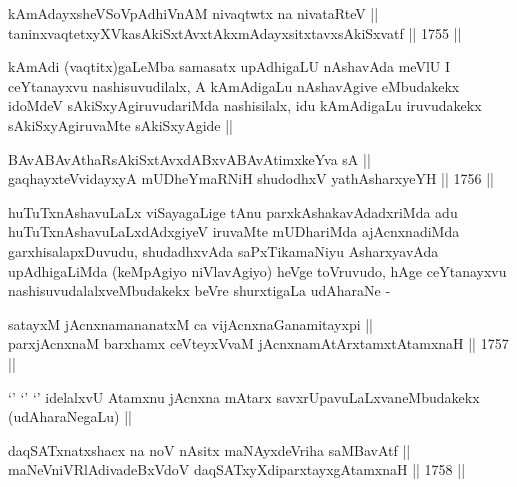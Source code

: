 
\begin{shl}
kAmAdayxsheVSoVpAdhiVnAM nivaqtwtx na nivataRteV || \\
taninxvaqtetxyXVkasAkiSxtAvxtAkxmAdayxsitxtavxsAkiSxvatf ||  1755 ||  
\end{shl}

\begin{artha}
kAmAdi (vaqtitx)gaLeMba samasatx upAdhigaLU nAshavAda meVlU I
ceYtanayxvu nashisuvudilalx, A kAmAdigaLu nAshavAgive eMbudakekx
idoMdeV sAkiSxyAgiruvudariMda nashisilalx, idu kAmAdigaLu iruvudakekx
sAkiSxyAgiruvaMte sAkiSxyAgide ||
\end{artha}


\begin{shl}
BAvABAvAthaRsAkiSxtAvxdABxvABAvAtimxkeYva sA ||  \\
gaqhayxteV\s vidayxyA mUDheYmaRNiH shudodhxV yathA\s \s sharxyeYH ||  1756 ||  
\end{shl}

\begin{artha}
huTuTxnAshavuLaLx viSayagaLige tAnu parxkAshakavAdadxriMda adu
huTuTxnAshavuLaLxdAdxgiyeV iruvaMte mUDhariMda ajAcnxnadiMda
garxhisalapxDuvudu, shudadhxvAda saPxTikamaNiyu AsharxyavAda
upAdhigaLiMda (keMpAgiyo niVlavAgiyo) heVge toVruvudo, hAge
ceYtanayxvu nashisuvudalalxveMbudakekx beVre shurxtigaLa udAharaNe -
\end{artha}

\begin{shl}
satayxM jAcnxnamananatxM ca vijAcnxnaGanamitayxpi || \\
parxjAcnxnaM barxhamx ceVteyxVvaM jAcnxnamAtArxtamxtA\s \s tamxnaH ||  1757 ||  
\end{shl}

\begin{artha}
`\stext' `\stext' `\stext' idelalxvU Atamxnu jAcnxna mAtarx
  savxrUpavuLaLxvaneMbudakekx (udAharaNegaLu) ||
\end{artha}


\begin{shl}
daqSATxnatxshacx na noV nAsitx maNAyxdeVriha saMBavAtf || \\
maNeVniVRlAdivadeBxVdoV daqSATxyXdiparxtayxgAtamxnaH ||  1758 ||  
\end{shl}

